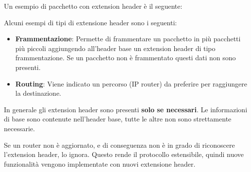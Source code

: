 \documentclass[a4paper]{article}
\begin{document}
\begin{example}
  Un esempio di pacchetto con extension header è il seguente:
  \label{28-11-D5}
\end{example}
\begin{example}
  Alcuni esempi di tipi di extensione header sono i seguenti:
  \begin{itemize}
    \item \textbf{Frammentazione}: Permette di frammentare un pacchetto in più pacchetti
      più piccoli aggiungendo all'header base un extension header di tipo frammentazione.
      Se un pacchetto non è frammentato questi dati non sono presenti.
      \label{28-11-D6}
    \item \textbf{Routing}: Viene indicato un percorso (IP router) da preferire per
      raggiungere la destinazione.
  \end{itemize}
\end{example}

\noindent
In generale gli extension header sono presenti \textbf{solo se necessari}. Le informazioni
di base sono contenute nell'header base, tutte le altre non sono strettamente necessarie.

Se un router non è aggiornato, e di conseguenza non è in grado di riconoscere l'extension
header, lo ignora. Questo rende il protocollo estensibile, quindi nuove funzionalità
vengono implementate con nuovi extensione header.
\end{document}
